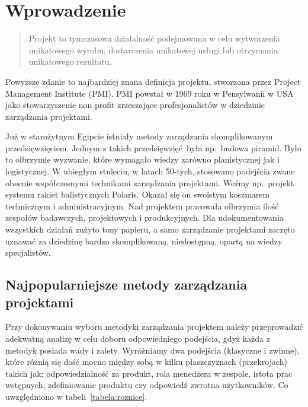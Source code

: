 
\chapter{Wprowadzenie}

\begin{quote}
Projekt to tymczasowa działalność podejmowana w celu wytworzenia unikatowego wyrobu,
dostarczenia unikatowej usługi lub otrzymania unikatowego rezultatu.
~\cite{PMI_2000}
\end{quote}

Powyższe zdanie to najbardziej znana definicja projektu, stworzona przez
Project Management Institute (PMI).
PMI powstał w 1969 roku w Pensylwanii w USA jako stowarzyszenie non profit
zrzeszające profesjonalistów w dziedzinie zarządzania projektami.

Już w starożytnym Egipcie istniały metody zarządzania skomplikowanym przedsięwzięciem.
Jednym z takich przedsięwzięć była np.\ budowa piramid.
Było to olbrzymie wyzwanie, które wymagało wiedzy zarówno planistycznej jak i logistycznej.
W ubiegłym stuleciu, w latach 50-tych, stosowano podejścia zwane obecnie współczesnymi
technikami zarządzania projektami. Weźmy np.\ projekt systemu rakiet balistycznych Polaris.
Okazał się on swoistym koszmarem technicznym i administracyjnym.
Nad projektem pracowała olbrzymia ilość zespołów badawczych, projektowych i produkcyjnych.
Dla udokumentowania wszystkich działań zużyto tony papieru,
a samo zarządzanie projektami zaczęto uznawać za dziedzinę bardzo skomplikowaną,
niedostępną, opartą na wiedzy specjalistów.
~\cite{Stanley_2013}

\section{Najpopularniejsze metody zarządzania projektami}
Przy dokonywaniu wyboru metodyki zarządzania projektem należy przeprowadzić
adekwatną analizę w celu doboru odpowiedniego podejścia,
gdyż każda z metodyk posiada wady i zalety.
Wyróżniamy dwa podejścia (klasyczne i zwinne), które różnią się dość mocno między sobą
w kilku płaszczyznach (przekrojach) takich jak:
odpowiedzialność za produkt, rola menedżera w zespole, istota prac wstępnych,
zdefiniowanie produktu czy odpowiedź zwrotna użytkowników.
Co uwzględniono w tabeli~\ref{tabela:roznice}.

